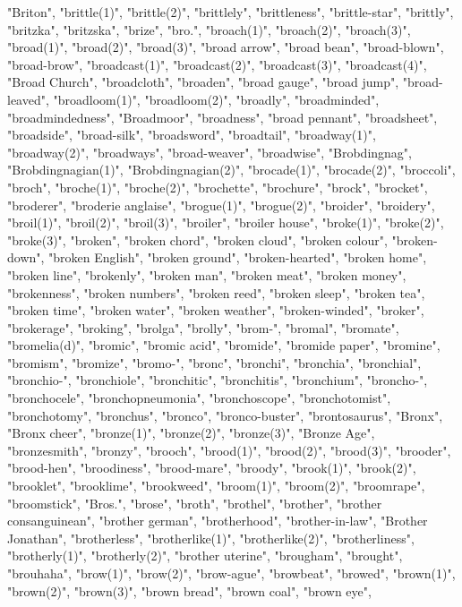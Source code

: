 "Briton",
"brittle(1)",
"brittle(2)",
"brittlely",
"brittleness",
"brittle-star",
"brittly",
"britzka",
"britzska",
"brize",
"bro.",
"broach(1)",
"broach(2)",
"broach(3)",
"broad(1)",
"broad(2)",
"broad(3)",
"broad arrow",
"broad bean",
"broad-blown",
"broad-brow",
"broadcast(1)",
"broadcast(2)",
"broadcast(3)",
"broadcast(4)",
"Broad Church",
"broadcloth",
"broaden",
"broad gauge",
"broad jump",
"broad-leaved",
"broadloom(1)",
"broadloom(2)",
"broadly",
"broadminded",
"broadmindedness",
"Broadmoor",
"broadness",
"broad pennant",
"broadsheet",
"broadside",
"broad-silk",
"broadsword",
"broadtail",
"broadway(1)",
"broadway(2)",
"broadways",
"broad-weaver",
"broadwise",
"Brobdingnag",
"Brobdingnagian(1)",
"Brobdingnagian(2)",
"brocade(1)",
"brocade(2)",
"broccoli",
"broch",
"broche(1)",
"broche(2)",
"brochette",
"brochure",
"brock",
"brocket",
"broderer",
"broderie anglaise",
"brogue(1)",
"brogue(2)",
"broider",
"broidery",
"broil(1)",
"broil(2)",
"broil(3)",
"broiler",
"broiler house",
"broke(1)",
"broke(2)",
"broke(3)",
"broken",
"broken chord",
"broken cloud",
"broken colour",
"broken-down",
"broken English",
"broken ground",
"broken-hearted",
"broken home",
"broken line",
"brokenly",
"broken man",
"broken meat",
"broken money",
"brokenness",
"broken numbers",
"broken reed",
"broken sleep",
"broken tea",
"broken time",
"broken water",
"broken weather",
"broken-winded",
"broker",
"brokerage",
"broking",
"brolga",
"brolly",
"brom-",
"bromal",
"bromate",
"bromelia(d)",
"bromic",
"bromic acid",
"bromide",
"bromide paper",
"bromine",
"bromism",
"bromize",
"bromo-",
"bronc",
"bronchi",
"bronchia",
"bronchial",
"bronchio-",
"bronchiole",
"bronchitic",
"bronchitis",
"bronchium",
"broncho-",
"bronchocele",
"bronchopneumonia",
"bronchoscope",
"bronchotomist",
"bronchotomy",
"bronchus",
"bronco",
"bronco-buster",
"brontosaurus",
"Bronx",
"Bronx cheer",
"bronze(1)",
"bronze(2)",
"bronze(3)",
"Bronze Age",
"bronzesmith",
"bronzy",
"brooch",
"brood(1)",
"brood(2)",
"brood(3)",
"brooder",
"brood-hen",
"broodiness",
"brood-mare",
"broody",
"brook(1)",
"brook(2)",
"brooklet",
"brooklime",
"brookweed",
"broom(1)",
"broom(2)",
"broomrape",
"broomstick",
"Bros.",
"brose",
"broth",
"brothel",
"brother",
"brother consanguinean",
"brother german",
"brotherhood",
"brother-in-law",
"Brother Jonathan",
"brotherless",
"brotherlike(1)",
"brotherlike(2)",
"brotherliness",
"brotherly(1)",
"brotherly(2)",
"brother uterine",
"brougham",
"brought",
"brouhaha",
"brow(1)",
"brow(2)",
"brow-ague",
"browbeat",
"browed",
"brown(1)",
"brown(2)",
"brown(3)",
"brown bread",
"brown coal",
"brown eye",

